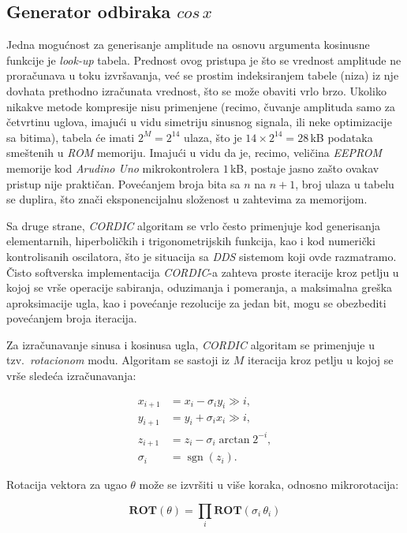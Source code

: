\documentclass[conference]{IEEEtran}
\DeclareMathOperator{\sgn}{sgn}
\begin{document}
\subsection{Generator odbiraka $cos\,x$}
Jedna mogućnost za generisanje amplitude na osnovu argumenta kosinusne funkcije je \textsl{look-up} tabela. Prednost ovog pristupa je što se vrednost amplitude ne proračunava u toku izvršavanja, već se prostim indeksiranjem tabele (niza) iz nje dovhata prethodno izračunata vrednost, što se može obaviti vrlo brzo. Ukoliko nikakve metode kompresije nisu primenjene (recimo, čuvanje amplituda samo za četvrtinu uglova, imajući u vidu simetriju sinusnog signala, ili neke optimizacije sa bitima), tabela će imati $2^M=2^{14}$ ulaza, što je $14\times 2^{14}=28$\,kB podataka smeštenih u \textsl{ROM} memoriju. Imajući u vidu da je, recimo, veličina \textsl{EEPROM} memorije kod \textsl{Arudino Uno} mikrokontrolera $1$\,kB, postaje jasno zašto ovakav pristup nije praktičan. Povećanjem broja bita sa $n$ na $n+1$, broj ulaza u tabelu se duplira, što znači eksponencijalnu složenost u zahtevima za memorijom. 

Sa druge strane, \textsl{CORDIC} algoritam se vrlo često primenjuje kod generisanja elementarnih, hiperboličkih i trigonometrijskih funkcija, kao i kod numerički kontrolisanih oscilatora, što je situacija sa \textsl{DDS} sistemom koji ovde razmatramo. Čisto softverska implementacija \textsl{CORDIC}-a zahteva proste iteracije kroz petlju u kojoj se vrše operacije sabiranja, oduzimanja i pomeranja, a maksimalna greška aproksimacije ugla, kao i povećanje rezolucije za jedan bit, mogu se obezbediti povećanjem broja iteracija.

Za izračunavanje sinusa i kosinusa ugla, \textsl{CORDIC} algoritam se primenjuje u tzv.~\textit{rotacionom} modu. Algoritam se sastoji iz $M$ iteracija kroz petlju u kojoj se vrše sledeća izračunavanja:

\begin{align}
x_{i+1} &= x_i - \sigma_i y_i \gg i , \label{eq:cordicX}		\\
y_{i+1} &= y_i + \sigma_i x_i \gg i  ,		\\
z_{i+1} &= z_i - \sigma_i\arctan{2^{-i}} ,		\\
\sigma_i &= \sgn(z_i) \label{eq:cordicSigma} .
\end{align}

Rotacija vektora za ugao $\theta$ može se izvršiti u više koraka, odnosno mikrorotacija:

\begin{equation}
\bm{ROT}(\theta) = \prod_i{\bm{ROT}(\sigma_i\,\theta_i)}
\end{equation}
\end{document}
